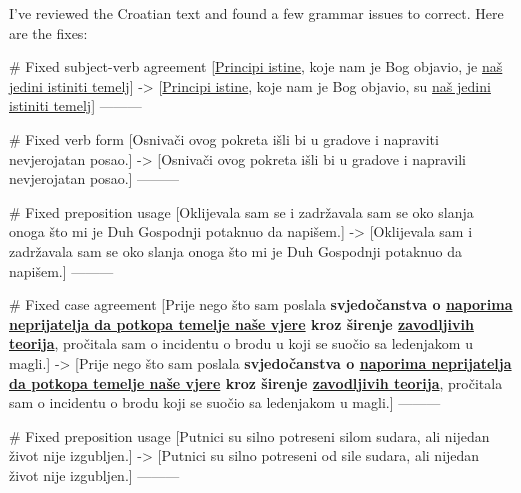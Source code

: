 I've reviewed the Croatian text and found a few grammar issues to correct. Here are the fixes:

# Fixed subject-verb agreement
[\underline{Principi istine}, koje nam je Bog objavio, je \underline{naš jedini istiniti temelj}]
->
[\underline{Principi istine}, koje nam je Bog objavio, su \underline{naš jedini istiniti temelj}]
---------

# Fixed verb form
[Osnivači ovog pokreta išli bi u gradove i napraviti nevjerojatan posao.]
->
[Osnivači ovog pokreta išli bi u gradove i napravili nevjerojatan posao.]
---------

# Fixed preposition usage
[Oklijevala sam se i zadržavala sam se oko slanja onoga što mi je Duh Gospodnji potaknuo da napišem.]
->
[Oklijevala sam i zadržavala sam se oko slanja onoga što mi je Duh Gospodnji potaknuo da napišem.]
---------

# Fixed case agreement
[Prije nego što sam poslala \textbf{svjedočanstva o \underline{naporima neprijatelja da potkopa temelje naše vjere} kroz širenje \underline{zavodljivih teorija}}, pročitala sam o incidentu o brodu u koji se suočio sa ledenjakom u magli.]
->
[Prije nego što sam poslala \textbf{svjedočanstva o \underline{naporima neprijatelja da potkopa temelje naše vjere} kroz širenje \underline{zavodljivih teorija}}, pročitala sam o incidentu o brodu koji se suočio sa ledenjakom u magli.]
---------

# Fixed preposition usage
[Putnici su silno potreseni silom sudara, ali nijedan život nije izgubljen.]
->
[Putnici su silno potreseni od sile sudara, ali nijedan život nije izgubljen.]
---------